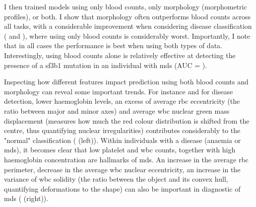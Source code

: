 I then trained models using only blood counts, only morphology (morphometric profiles), or both. I show that morphology often outperforms blood counts across all tasks, with a considerable improvement when considering disease classification ( and ), where using only blood counts is considerably worst. Importantly, I note that in all cases the performance is best when using both types of data. Interestingly, using blood counts alone is relatively effective at detecting the presence of a \ac{sf3b1} mutation in an individual with \ac{mds} (AUC = ).

\begin{figure}[!ht]
    \label{fig:roc-curves-binary}
\end{figure}

\begin{figure}[!ht]
    \label{fig:auc-binary}
\end{figure}

Inspecting how different features impact prediction using both blood counts and morphology can reveal some important trends. For instance and for disease detection, lower haemoglobin levels, an excess of average \ac{rbc} eccentricity (the ratio between major and minor axes) and average \ac{wbc} nuclear green mass displacement (measures how much the red colour distribution is shifted from the centre, thus quantifying nuclear irregularities) contributes considerably to the "normal" classification ( (left)). Within individuals with a disease (anaemia or \ac{mds}), it becomes clear that low platelet and \ac{wbc} counts, together with high haemoglobin concentration are hallmarks of \ac{mds}. An increase in the average \ac{rbc} perimeter, decrease in the average \ac{wbc} nuclear eccentricity, an increase in the variance of \ac{wbc} solidity (the ratio between the object and its convex hull, quantifying deformations to the shape) can also be important in diagnostic of \ac{mds} ( (right)).

